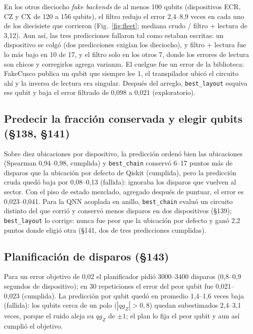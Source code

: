 \documentclass[11pt]{article}
\newcommand{\qZ}{qg_Z}
\begin{document}
En los otros dieciocho \emph{fake backends} de al menos 100 qubits (dispositivos ECR, CZ y CX de 120 a 156
qubits), el filtro redujo el error 2{,}4--8{,}9 veces en cada uno de los diecisiete que corrieron
(Fig.~\ref{fig:fleet}; mediana crudo / filtro + lectura de 3{,}12). Aun así, las tres predicciones fallaron
tal como estaban escritas: un dispositivo se colgó (dos predicciones exigían los dieciocho), y filtro +
lectura fue lo más bajo en 10 de 17, y el filtro solo en los otros 7, donde los errores de lectura son chicos
y corregirlos agrega varianza. El cuelgue fue un error de la biblioteca: FakeCusco publica un qubit que
siempre lee 1, el transpilador ubicó el circuito ahí y la inversa de lectura era singular. Después del
arreglo, \texttt{best\_layout} esquiva ese qubit y baja el error filtrado de 0{,}098 a 0{,}021 (exploratorio).

\subsection{Predecir la fracción conservada y elegir qubits (§138, §141)}

Sobre diez ubicaciones por dispositivo, la predicción ordenó bien las ubicaciones (Spearman 0{,}94--0{,}98,
cumplida) y \texttt{best\_chain} conservó 6--17 puntos más de disparos que la ubicación por defecto de Qiskit
(cumplida), pero la predicción cruda quedó baja por 0{,}08--0{,}13 (fallida): ignoraba los disparos que
vuelven al sector. Con el piso de estado mezclado, agregado después de puntuar, el error es 0{,}023--0{,}041.
Para la QNN acoplada en anillo, \texttt{best\_chain} evaluó un circuito distinto del que corrió y conservó
menos disparos en dos dispositivos (§139); \texttt{best\_layout} lo corrige: nunca fue peor que la ubicación
por defecto y ganó 2{,}2 puntos donde eligió otra (§141, dos de tres predicciones cumplidas).

\subsection{Planificación de disparos (§143)}

Para un error objetivo de 0{,}02 el planificador pidió 3000--3400 disparos (0{,}8--0{,}9 segundos de
dispositivo); en 30 repeticiones el error del peor qubit fue 0{,}021--0{,}023 (cumplida). La predicción por
qubit quedó en promedio 1{,}4--1{,}6 veces baja (fallida): los qubits cerca de un polo ($|\qZ|>0{,}8$)
quedan subestimados 2{,}4--3{,}1 veces, porque el ruido aleja su $\qZ$ de $\pm1$; el plan lo fija el peor
qubit y aun así cumplió el objetivo.
\end{document}
